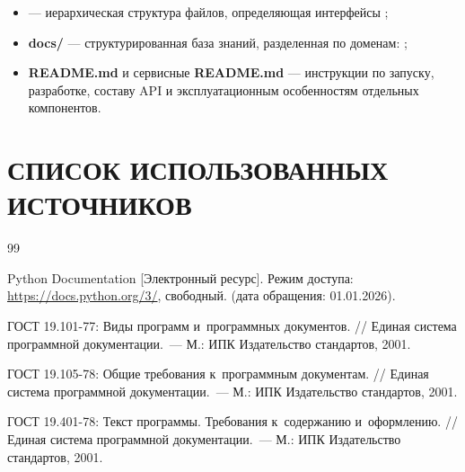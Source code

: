 \documentclass[12pt,a4paper]{extarticle}
\begin{document}
\begin{hseExample}
\begin{itemize}[leftmargin=1.25cm]
    \item \textbf{} --- иерархическая структура файлов, определяющая интерфейсы ;
    \item \textbf{docs/} --- структурированная база знаний, разделенная по доменам: ;
    \item \textbf{README.md} и сервисные \textbf{README.md} --- инструкции по запуску, разработке, составу API и эксплуатационным особенностям отдельных компонентов.
\end{itemize}
\end{hseExample}

\clearpage
\pagestyle{appendix}

\section*{СПИСОК ИСПОЛЬЗОВАННЫХ ИСТОЧНИКОВ}

\renewcommand{\refname}{}
\begin{thebibliography}{99}
\vspace{-1cm}

Python Documentation [Электронный ресурс]. Режим доступа: \url{https://docs.python.org/3/}, свободный. (дата обращения: 01.01.2026).

ГОСТ 19.101-77: Виды программ и~программных документов. // Единая система программной документации.~--- М.: ИПК Издательство стандартов, 2001.

ГОСТ 19.105-78: Общие требования к~программным документам. // Единая система программной документации.~--- М.: ИПК Издательство стандартов, 2001.

ГОСТ 19.401-78: Текст программы. Требования к~содержанию и~оформлению. // Единая система программной документации.~--- М.: ИПК Издательство стандартов, 2001.

\end{thebibliography}

\clearpage



\end{document}
